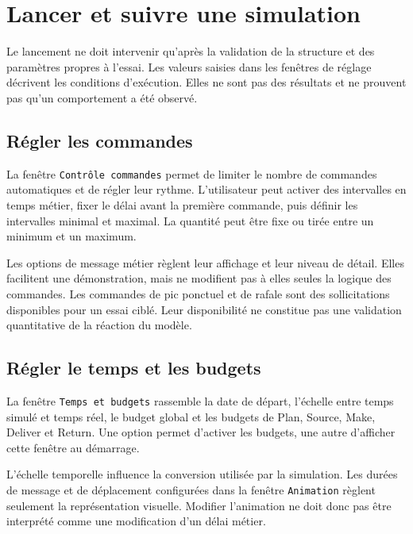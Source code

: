 \chapter{Lancer et suivre une simulation}
\label{chap:lancer-suivre}

Le lancement ne doit intervenir qu'après la validation de la structure et des paramètres propres à l'essai. Les valeurs saisies dans les fenêtres de réglage décrivent les conditions d'exécution. Elles ne sont pas des résultats et ne prouvent pas qu'un comportement a été observé.

\section{Régler les commandes}

La fenêtre \texttt{Contrôle commandes} permet de limiter le nombre de commandes automatiques et de régler leur rythme. L'utilisateur peut activer des intervalles en temps métier, fixer le délai avant la première commande, puis définir les intervalles minimal et maximal. La quantité peut être fixe ou tirée entre un minimum et un maximum.

Les options de message métier règlent leur affichage et leur niveau de détail. Elles facilitent une démonstration, mais ne modifient pas à elles seules la logique des commandes. Les commandes de pic ponctuel et de rafale sont des sollicitations disponibles pour un essai ciblé. Leur disponibilité ne constitue pas une validation quantitative de la réaction du modèle.


\section{Régler le temps et les budgets}

La fenêtre \texttt{Temps et budgets} rassemble la date de départ, l'échelle entre temps simulé et temps réel, le budget global et les budgets de Plan, Source, Make, Deliver et Return. Une option permet d'activer les budgets, une autre d'afficher cette fenêtre au démarrage.

L'échelle temporelle influence la conversion utilisée par la simulation. Les durées de message et de déplacement configurées dans la fenêtre \texttt{Animation} règlent seulement la représentation visuelle. Modifier l'animation ne doit donc pas être interprété comme une modification d'un délai métier.

